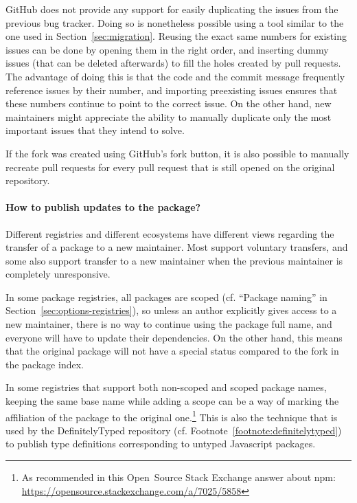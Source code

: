 GitHub does not provide any support for easily duplicating the issues from the previous bug tracker.
Doing so is nonetheless possible using a tool similar to the one used in Section~\ref{sec:migration}.
Reusing the exact same numbers for existing issues can be done by opening them in the right order, and inserting dummy issues (that can be deleted afterwards) to fill the holes created by pull requests.
The advantage of doing this is that the code and the commit message frequently reference issues by their number, and importing preexisting issues ensures that these numbers continue to point to the correct issue.
On the other hand, new maintainers might appreciate the ability to manually duplicate only the most important issues that they intend to solve.

If the fork was created using GitHub's fork button, it is also possible to manually recreate pull requests for every pull request that is still opened on the original repository.

\paragraph{How to publish updates to the package?}

Different registries and different ecosystems have different views regarding the transfer of a package to a new maintainer.
Most support voluntary transfers, and some also support transfer to a new maintainer when the previous maintainer is completely unresponsive.

In some package registries, all packages are scoped (cf. ``Package naming'' in Section~\ref{sec:options-registries}), so unless an author explicitly gives access to a new maintainer, there is no way to continue using the package full name, and everyone will have to update their dependencies.
On the other hand, this means that the original package will not have a special status compared to the fork in the package index.

In some registries that support both non-scoped and scoped package names, keeping the same base name while adding a scope can be a way of marking the affiliation of the package to the original one.\footnote{
	As recommended in this Open Source Stack Exchange answer about npm: \url{https://opensource.stackexchange.com/a/7025/5858}
}
This is also the technique that is used by the DefinitelyTyped repository (cf. Footnote~\ref{footnote:definitelytyped}) to publish type definitions corresponding to untyped Javascript packages.

